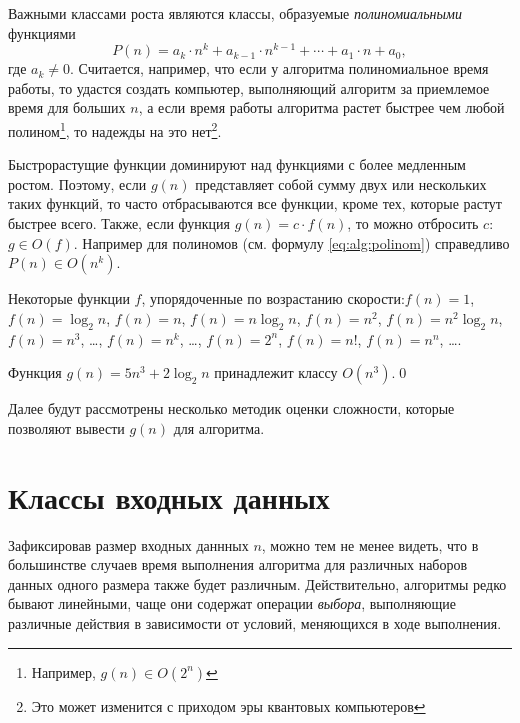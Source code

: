 Важными классами роста являются классы, образуемые \emph{полиномиальными} функциями 
\begin{equation}
    P(n)=a_k\cdot n^k + a_{k-1}\cdot n^{k-1} + \cdots + a_1\cdot n + a_0,
    \label{eq:alg:polinom}
\end{equation}
где $a_k\neq 0$. Считается, например, что если у алгоритма полиномиальное время работы, то удастся создать компьютер, выполняющий алгоритм за приемлемое время для больших $n$, а если время работы алгоритма растет быстрее чем любой полином\footnote{Например, $g(n)\in O(2^n)$}, то надежды на это нет\footnote{Это может изменится с приходом эры квантовых компьютеров}.

Быстрорастущие функции доминируют над функциями с более медленным ростом. Поэтому, если $g(n)$ представляет собой сумму двух или нескольких таких функций, то часто отбрасываются все функции, кроме тех, которые растут быстрее всего. Также, если функция $g(n)=c\cdot f(n)$, то можно отбросить $c$: $g\in O(f)$. Например для полиномов (см. формулу \eqref{eq:alg:polinom}) справедливо $P(n)\in O(n^k)$.

Некоторые функции $f$, упорядоченные по возрастанию скорости:$f(n)=1$, $f(n)=\log_2n$, $f(n)=n$, $f(n)=n\log_2n$, $f(n)=n^2$, $f(n)=n^2\log_2n$, $f(n)=n^3$, \ldots, $f(n)=n^k$, \ldots, $f(n)=2^n$, $f(n)=n!$, $f(n)=n^n$, \ldots.

\begin{exampl} 
    \label{exampl:alg:strongest}
    Функция $g(n)=5n^3+2\log_2n$ принадлежит классу $O(n^3)$.\qed
\end{exampl}

Далее будут рассмотрены несколько методик оценки сложности, которые позволяют вывести $g(n)$ для алгоритма.


\section{Классы входных данных}

Зафиксировав размер входных даннных $n$, можно тем не менее видеть, что в большинстве случаев время выполнения алгоритма для различных наборов данных одного размера также будет различным. Действительно, алгоритмы редко бывают линейными, чаще они содержат операции \emph{выбора}, выполняющие различные действия в зависимости от условий, меняющихся в ходе выполнения.

